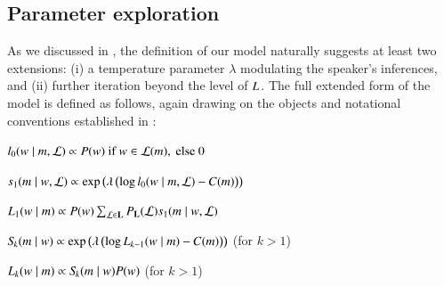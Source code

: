 \documentclass[leqno,12pt]{article}
\begin{document}
\begin{appendix}

\section{Parameter exploration}\label{app:paramexplore}

As we discussed in , the definition of our model
naturally suggests at least two extensions: (i) a temperature
parameter $\lambda$ modulating the speaker's inferences, and (ii)
further iteration beyond the level of $\UncertaintyListener$. The full
extended form of the model is defined as follows, again drawing on the
objects and notational conventions established in :
%
\begin{examples}
\item\label{agents-extended}
  \begin{examples}
  \item
    $\listenerZero(\state \given \msg, \Lex) \propto 
    \StatePrior(\state) \text{ if } \state \in \Lex(\msg), \text{ else } 0$

  \item 
    $\speakerOne(\msg \given \state, \Lex) \propto
    \exp
    \left(\lambda \left(
      \log\listenerZero(\state \given \msg, \Lex)
      - 
      \Costs(\msg)\right)
    \right)$
    
  \item
    $\UncertaintyListener[1](\state \given \msg) 
    \propto 
    \StatePrior(\state)
    \sum_{\Lex \in \LexSet}
    \LexPrior(\Lex)
    \speakerOne(\msg \given \state, \Lex)$

  \item $\UncertaintySpeaker{k}(\msg \given \state) \propto
    \exp
    \left(\lambda \left(
      \log\UncertaintyListener[k-1](\state \given \msg)
      - 
      \Costs(\msg)
    \right)\right)$
  \hfill (for $k > 1$)

  \item $\UncertaintyListener[k](\state \given \msg) \propto 
    \UncertaintySpeaker{k}(\msg \given \state) \StatePrior(\state)$
    \hfill (for $k > 1$)
  \end{examples}
\end{examples}


\end{appendix}
\end{document}
